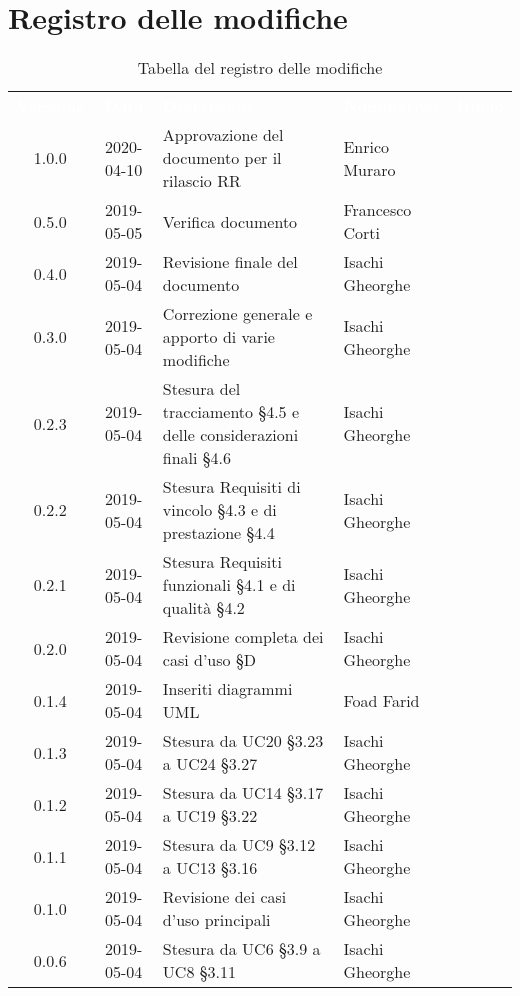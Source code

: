 \renewcommand{\arraystretch}{1.5}

\section*{Registro delle modifiche}
{

\begin{table}[H]
\centering\renewcommand{\arraystretch}{1.5}
\caption{Tabella del registro delle modifiche}
\vspace{0.2cm}
\begin{tabular}{c c  C{4cm} C{3cm}  c }
\textcolor{white}{\textbf{Versione}} & \textcolor{white}{\textbf{Data}} & \textcolor{white}{\textbf{Descrizione}} & \textcolor{white}{\textbf{Nominativo}} & \textcolor{white}{\textbf{Ruolo}}\\

1.0.0 & 2020-04-10 & Approvazione del documento per il rilascio RR & Enrico Muraro & \Res{}\\
0.5.0 & 2019-05-05 & Verifica documento & Francesco Corti &\ver{}\\
0.4.0 & 2019-05-04 & Revisione finale del documento & Isachi Gheorghe &\reda{}\\	
0.3.0 & 2019-05-04 & Correzione generale e apporto di varie modifiche & Isachi Gheorghe &\reda{}\\	
0.2.3 & 2019-05-04 &  Stesura del tracciamento \S{4.5} e delle considerazioni finali \S{4.6} & Isachi Gheorghe &\reda{}\\	
0.2.2 & 2019-05-04 & Stesura Requisiti di vincolo \S{4.3} e di prestazione \S{4.4} & Isachi Gheorghe &\reda{}\\	
0.2.1 & 2019-05-04 & Stesura Requisiti funzionali \S{4.1} e di qualità \S{4.2} & Isachi Gheorghe &\reda{}\\	
0.2.0 & 2019-05-04 & Revisione completa dei casi d'uso \S{D} & Isachi Gheorghe &\reda{}\\	
0.1.4 & 2019-05-04 & Inseriti diagrammi UML & Foad Farid &\reda{}\\	
0.1.3 & 2019-05-04 & Stesura da UC20 \S{3.23} a UC24 \S{3.27} & Isachi Gheorghe &\reda{}\\	
0.1.2 & 2019-05-04 & Stesura da UC14 \S{3.17} a UC19 \S{3.22} & Isachi Gheorghe &\reda{}\\	 
0.1.1 & 2019-05-04 & Stesura da UC9 \S{3.12} a UC13 \S{3.16} & Isachi Gheorghe &\reda{}\\
0.1.0 & 2019-05-04 & Revisione dei casi d'uso principali & Isachi Gheorghe &\reda{}\\				
0.0.6 & 2019-05-04 & Stesura da UC6 \S{3.9} a UC8 \S{3.11} & Isachi Gheorghe &\reda{}\\	
		

\end{tabular}
\end{table}}
